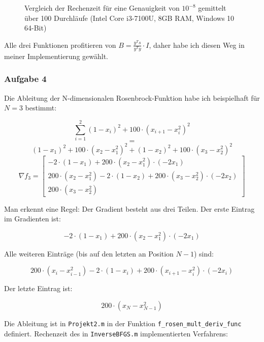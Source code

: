 \documentclass[a4paper, 12pt]{report}
\begin{document}
\begin{figure}[H]
\begin{minipage}{.3\textwidth}
  \end{minipage}
  \caption{Vergleich der Rechenzeit für eine Genauigkeit von $10^{-8}$ gemittelt über 100 Durchläufe (Intel Core i3-7100U, 8GB RAM, Windows 10 64-Bit)}
\end{figure}

Alle drei Funktionen profitieren von $B = \frac{y^Ts}{y^Ty}\cdot I$, daher habe ich diesen Weg in meiner Implementierung gewählt.

\subsubsection{Aufgabe 4}

Die Ableitung der N-dimensionalen Rosenbrock-Funktion habe ich beispielhaft für $N=3$ bestimmt:

  $$\sum_{i=1}^2 (1 - x_i)^2 + 100\cdot(x_{i+1} - x_i^2)^2$$
  $$=$$
  $$(1 - x_1)^2 + 100\cdot (x_2 - x_1^2)^2 + (1 - x_2)^2 + 100\cdot(x_3 - x_2^2)^2$$
  $$\nabla f_3 = \begin{bmatrix}-2\cdot(1 - x_1) + 200\cdot(x_2 - x_1^2)\cdot(-2x_1)\\
    200\cdot(x_2 - x_1^2) - 2\cdot(1 - x_2) + 200\cdot(x_3 - x_2^2)\cdot(-2x_2)\\
    200\cdot(x_3 - x_2^2)\end{bmatrix}$$

Man erkennt eine Regel: Der Gradient besteht aus drei Teilen. Der erste Eintrag im Gradienten ist:

$$-2\cdot(1 - x_1) + 200\cdot(x_2 - x_1^2)\cdot(-2x_1)$$

Alle weiteren Einträge (bis auf den letzten an Position $N-1$) sind:

$$200\cdot(x_i - x_{i-1}^2) - 2\cdot(1 - x_i) + 200\cdot(x_{i+1} - x_i^2)\cdot(-2x_i)$$

Der letzte Eintrag ist:

$$200\cdot(x_N - x_{N-1}^2)$$

Die Ableitung ist in \lstinline[basicstyle=\ttfamily\color{black}]|Projekt2.m| in der Funktion
\lstinline[basicstyle=\ttfamily\color{black}]|f_rosen_mult_deriv_func| definiert.
Rechenzeit des in \lstinline[basicstyle=\ttfamily\color{black}]|InverseBFGS.m| implementierten Verfahrens:
\end{document}
